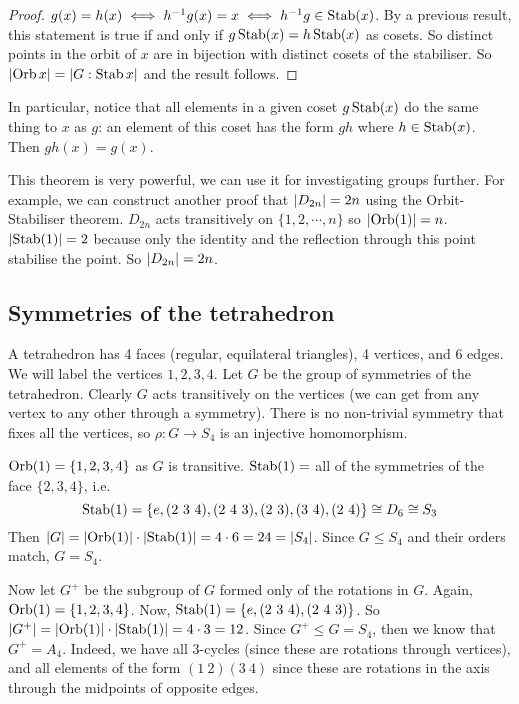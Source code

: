 \begin{proof}
	\(g(x) = h(x) \iff h^{-1}g(x) = x \iff h^{-1}g \in \operatorname{Stab}(x)\).
	By a previous result, this statement is true if and only if
	\(g \operatorname{Stab}(x) = h \operatorname{Stab}(x)\) as cosets.
	So distinct points in the orbit of \(x\) are in bijection with distinct cosets of the stabiliser.
	So \(\abs{\operatorname{Orb} x} = \abs{G : \operatorname{Stab} x}\) and the result follows.
\end{proof}
In particular, notice that all elements in a given coset \(g \operatorname{Stab}(x)\) do the same thing to \(x\) as \(g\): an element of this coset has the form \(gh\) where \(h \in \operatorname{Stab}(x)\).
Then \(gh(x) = g(x)\).

This theorem is very powerful, we can use it for investigating groups further.
For example, we can construct another proof that \(\abs{D_{2n}} = 2n\) using the Orbit-Stabiliser theorem.
\(D_{2n}\) acts transitively on \(\{1, 2, \cdots, n\}\) so \(\abs{\operatorname{Orb}(1)} = n\).
\(\abs{\operatorname{Stab}(1)} = 2\) because only the identity and the reflection through this point stabilise the point.
So \(\abs{D_{2n}} = 2n\).

\subsection{Symmetries of the tetrahedron}
A tetrahedron has 4 faces (regular, equilateral triangles), 4 vertices, and 6 edges.
We will label the vertices \(1, 2, 3, 4\).
Let \(G\) be the group of symmetries of the tetrahedron.
Clearly \(G\) acts transitively on the vertices (we can get from any vertex to any other through a symmetry).
There is no non-trivial symmetry that fixes all the vertices, so \(\rho\colon G \to S_4\) is an injective homomorphism.

\(\operatorname{Orb}(1) = \{ 1, 2, 3, 4 \}\) as \(G\) is transitive.
\(\operatorname{Stab}(1) =\) all of the symmetries of the face \(\{2,3,4\}\), i.e.
\[
	\operatorname{Stab}(1) = \{ e, (2\ 3\ 4), (2\ 4\ 3), (2\ 3), (3\ 4), (2\ 4) \} \cong D_6 \cong S_3
\]
Then \(\abs{G} = \abs{\operatorname{Orb}(1)} \cdot \abs{\operatorname{Stab}(1)} = 4 \cdot 6 = 24 = \abs{S_4}\).
Since \(G \leq S_4\) and their orders match, \(G = S_4\).

Now let \(G^+\) be the subgroup of \(G\) formed only of the rotations in \(G\).
Again, \(\operatorname{Orb}(1) = \{ 1, 2, 3, 4 \}\).
Now, \(\operatorname{Stab}(1) = \{ e, (2\ 3\ 4), (2\ 4\ 3) \}\).
So \(\abs{G^+} = \abs{\operatorname{Orb}(1)} \cdot \abs{\operatorname{Stab}(1)} = 4 \cdot 3 = 12\).
Since \(G^+ \leq G = S_4\), then we know that \(G^+ = A_4\).
Indeed, we have all 3-cycles (since these are rotations through vertices), and all elements of the form \((1\ 2)(3\ 4)\) since these are rotations in the axis through the midpoints of opposite edges.

